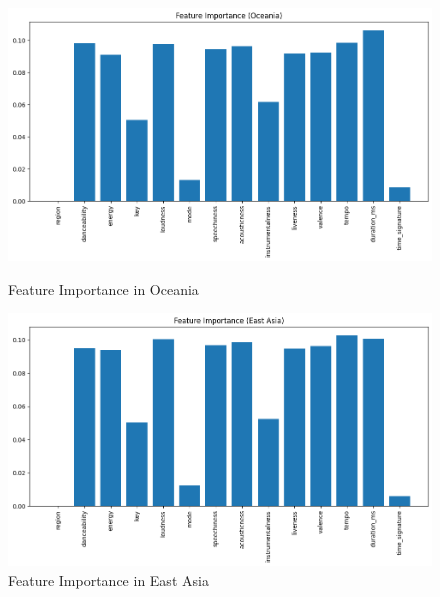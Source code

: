 \begin{figure}[h]
    \centering
    \begin{minipage}{0.45\textwidth}
        \centering
        \includegraphics[width=\linewidth]{media/rf_feature_imp_ocenia.png}
        \caption{Feature Importance in Oceania}
    \end{minipage}%
    \hspace{0.05\textwidth} %
    \begin{minipage}{0.45\textwidth}
        \centering
        \includegraphics[width=\linewidth]{media/rf_feature_imp_east_asia.png}
        \caption{Feature Importance in East Asia}
    \end{minipage}
\end{figure}
